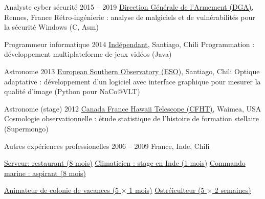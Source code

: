 \begin{joblist}[12.8][8.4][4]

\setlength{\parskip}{0.3cm}
\vspace{-0.4cm}

\item[Analyste cyber sécurité]{2015 -- 2019}
  {
  \href{http://www.defense.gouv.fr/dga/}{Direction Générale de l'Armement (DGA)}, Rennes, France
  }
  {Rétro-ingénierie : analyse de malgiciels et de vulnérabilités pour la sécurité Windows (C, Asm)}

\item[Programmeur informatique]{2014}
  {
  \tbfihuman
  \href{https://tinmarino.github.io/page/}{Indépendant}, Santiago, Chili
  }
  {Programmation : développement multiplateforme de jeux vidéos (Java)}



\item[Astronome]{2013}
  {
  \href{http://www.eso.org/public/}{European Southern Observatory (ESO)}, Santiago, Chili
  }
  {Optique adaptative : développement d'un logiciel avec interface graphique pour mesurer la qualité d'image (Python pour NaCo@VLT)}

\item[Astronome (stage)]{2012}
  {
\href{https://www.cfht.hawaii.edu/}{Canada France Hawaii Telescope (CFHT)}, Waimea, USA
  }
  {Cosmologie observationnelle : étude statistique de l'histoire de formation stellaire (Supermongo)}

\item[Autres expériences professionelles]{2006 -- 2009}
  {
  France, Inde, Chili
  }
  {
    \renewcommand\labelitemi{{}}
    \vspace{-0.8cm}
    \setlength{\parskip}{0cm}
    \begin{itemize}
    \setlength\itemsep{0cm}
    \cvitem \href{http://www.insertcoin.cl/}{\tbfiic Serveur: restaurant (8 mois)}
    \cvitem \href{http://www.dupont.co.in/}{ Climaticien : stage en Inde (1 mois)}
    \cvitem \href{http://www.defense.gouv.fr/marine/organisation/forces/fusiliers-marins-et-commandos/force-maritime-des-fusiliers-marins-et-commandos}{ Commando marine : aspirant (8 mois)}

    \cvitem \href{http://www.vacances-pour-tous.org/}{ Animateur de colonie de vacances (5 $\times$ 1 mois)}
    \cvitem \href{http://huitresdesaintvaast.fr/}{\tbfioyster Ostréiculteur (5 $\times$ 2 semaines)}
    \end{itemize}
  }
\end{joblist}



\ifx\HCode\undefined \else
\maketitle
\fi




